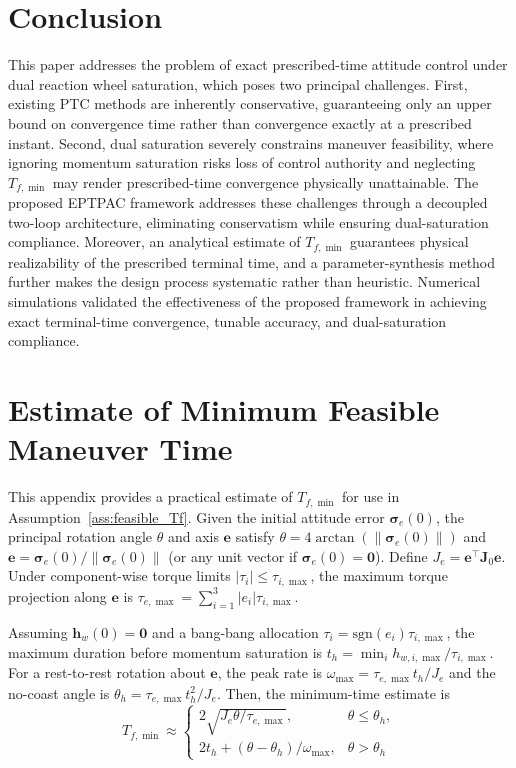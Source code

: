 \documentclass[journal]{new-aiaa}
\begin{document}
\newpage
\section{Conclusion}
\label{section:conclusion}
This paper addresses the problem of exact prescribed-time attitude control under dual reaction wheel saturation, which poses two principal challenges. First, existing PTC methods are inherently conservative, guaranteeing only an upper bound on convergence time rather than convergence exactly at a prescribed instant. Second, dual saturation severely constrains maneuver feasibility, where ignoring momentum saturation risks loss of control authority and neglecting $T_{f,\min}$ may render prescribed-time convergence physically unattainable. The proposed EPTPAC framework addresses these challenges through a decoupled two-loop architecture, eliminating conservatism while ensuring dual-saturation compliance. Moreover, an analytical estimate of $T_{f,\min}$ guarantees physical realizability of the prescribed terminal time, and a parameter-synthesis method further makes the design process systematic rather than heuristic.
Numerical simulations validated the effectiveness of the proposed framework in achieving exact terminal-time convergence, tunable accuracy, and dual-saturation compliance.

\appendix
\section{Estimate of Minimum Feasible Maneuver Time}
\label{app:bangbang}

This appendix provides a practical estimate of $T_{f,\min}$ for use in Assumption~\ref{ass:feasible_Tf}.
Given the initial attitude error $\boldsymbol{\sigma}_e(0)$, the principal rotation angle $\theta$ and axis $\boldsymbol{e}$ satisfy
$\theta = 4\arctan(\|\boldsymbol{\sigma}_e(0)\|)$ and
$\boldsymbol{e} = \boldsymbol{\sigma}_e(0)/\|\boldsymbol{\sigma}_e(0)\|$ (or any unit vector if $\boldsymbol{\sigma}_e(0)=\boldsymbol{0}$).
Define $J_e = \boldsymbol{e}^\top\boldsymbol{J}_0\boldsymbol{e}$.
Under component-wise torque limits $|\tau_i|\le\tau_{i,\max}$, the maximum torque projection along $\boldsymbol{e}$ is
$\tau_{e,\max}= \sum_{i=1}^{3}|e_i|\tau_{i,\max}$.

Assuming $\boldsymbol{h}_w(0)=\boldsymbol{0}$ and a bang-bang allocation $\tau_i=\mathrm{sgn}(e_i)\tau_{i,\max}$,
the maximum duration before momentum saturation is
$t_h = \min_i h_{w,i,\max}/\tau_{i,\max}$.
For a rest-to-rest rotation about $\boldsymbol{e}$,
the peak rate is $\omega_{\max}= \tau_{e,\max}t_h/J_e$
and the no-coast angle is $\theta_h = \tau_{e,\max}t_h^2/J_e$.
Then, the minimum-time estimate is
\begin{equation}
T_{f,\min}\approx
\begin{cases}
2\sqrt{J_e\theta/\tau_{e,\max}}, & \theta \le \theta_h,\\[6pt]
2t_h + (\theta-\theta_h)/\omega_{\max}, & \theta > \theta_h
\end{cases}
\label{eq:app_Tmin_piecewise}
\end{equation}
\end{document}
